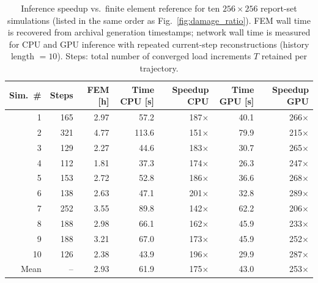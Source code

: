 \documentclass[10pt]{article}
\theoremstyle{definition}
\begin{document}
\begin{table}[htbp]
\centering
\caption{Inference speedup vs.\ finite element reference for ten $256\times256$ report-set simulations (listed in the same order as Fig.~\ref{fig:damage_ratio}). FEM wall time is recovered from archival generation timestamps; network wall time is measured for CPU and GPU inference with repeated current-step reconstructions (history length $=10$). Steps: total number of converged load increments $T$ retained per trajectory.}
\label{tab:rollout_speedup_256}
\begin{tabular}{r r r r r r r}
\toprule
Sim.\ \# & Steps & FEM [h] & Time CPU [s] & Speedup CPU & Time GPU [s] & Speedup GPU \\
\midrule
1 & 165 & 2.97 & 57.2 & 187$\times$ & 40.1 & 266$\times$ \\
2 & 321 & 4.77 & 113.6 & 151$\times$ & 79.9 & 215$\times$ \\
3 & 129 & 2.27 & 44.6 & 183$\times$ & 30.7 & 265$\times$ \\
4 & 112 & 1.81 & 37.3 & 174$\times$ & 26.3 & 247$\times$ \\
5 & 153 & 2.72 & 52.8 & 186$\times$ & 36.6 & 268$\times$ \\
6 & 138 & 2.63 & 47.1 & 201$\times$ & 32.8 & 289$\times$ \\
7 & 252 & 3.55 & 89.8 & 142$\times$ & 62.2 & 206$\times$ \\
8 & 188 & 2.98 & 66.1 & 162$\times$ & 45.9 & 233$\times$ \\
9 & 188 & 3.21 & 67.0 & 173$\times$ & 45.9 & 252$\times$ \\
10 & 126 & 2.38 & 43.9 & 196$\times$ & 29.9 & 287$\times$ \\
\midrule
Mean & -- & 2.93 & 61.9 & 175$\times$ & 43.0 & 253$\times$ \\
\bottomrule
\end{tabular}
\end{table}
\end{document}
